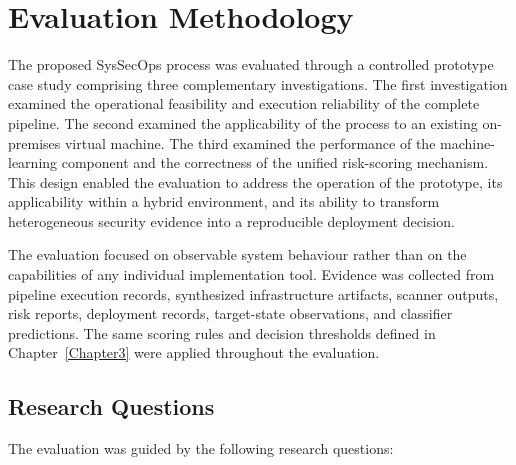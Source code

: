 \section{Evaluation Methodology}
\label{sec:evaluation-methodology}

The proposed SysSecOps process was evaluated through a controlled prototype case study
comprising three complementary investigations. The first investigation examined the
operational feasibility and execution reliability of the complete pipeline. The second
examined the applicability of the process to an existing on-premises virtual machine.
The third examined the performance of the machine-learning component and the correctness
of the unified risk-scoring mechanism. This design enabled the evaluation to address the
operation of the prototype, its applicability within a hybrid environment, and its
ability to transform heterogeneous security evidence into a reproducible deployment
decision.

The evaluation focused on observable system behaviour rather than on the capabilities of
any individual implementation tool. Evidence was collected from pipeline execution
records, synthesized infrastructure artifacts, scanner outputs, risk reports, deployment
records, target-state observations, and classifier predictions. The same scoring rules
and decision thresholds defined in Chapter~\ref{Chapter3} were applied throughout the
evaluation.

\subsection{Research Questions}
\label{subsec:evaluation-rqs}

The evaluation was guided by the following research questions:

